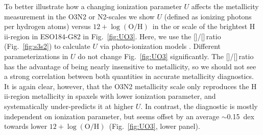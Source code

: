 \documentclass[traditabstract, referee]{aa}
\newcommand{\hii}{\mbox{H\,{\sc ii}}}
\newcommand{\oh}{12+\log(\mathrm{O/H})}
\newcommand{\sii}{[\ion{S}{ii}]}
\newcommand{\siii}{[\ion{S}{iii}]}
\begin{document}
\begin{appendix}
To better illustrate how a changing ionization parameter $U$ affects the metallicity measurement in the O3N2 or N2-scales we show $U$ (defined as ionizing photons per hydrogen atoms) versus $\oh$\, in the \citet{2004MNRAS.348L..59P} or \citet{2016Ap&SS.361...61D} scale of the brightest \hii-region in ESO184-G82 in Fig.~\ref{fig:UO3}. Here, we use the \sii/\siii\,ratio (Fig.~\ref{fig:s3s2}) to calculate $U$ via photo-ionization models \citep{2011MNRAS.415.3616D}. Different parameterizations in $U$ \citep[e.g.][]{2016A&A...594A..37M} do not change Fig.~\ref{fig:UO3} significantly. The \sii/\siii\,ratio has the advantage of being nearly insensitive to metallicity, so we should not see a strong correlation between both quantities in accurate metallicity diagnostics. It is again clear, however, that the O3N2 metallicity scale only reproduces the \hii-region metallicity in spaxels with lower ionization parameter, and systematically under-predicts it at higher $U$. In contrast, the \citet{2016Ap&SS.361...61D} diagnostic is mostly independent on ionization parameter, but seems offset by an average $\sim$0.15~dex towards lower $\oh$\, (Fig.~\ref{fig:UO3}, lower panel).

\end{appendix}
\end{document}
